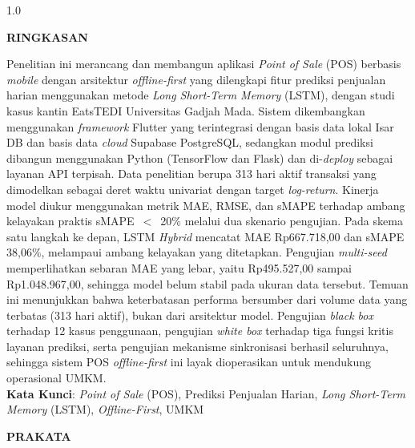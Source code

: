 \documentclass[12pt, a4paper, onecolumn, oneside]{report}
\begin{document}
\clearpage
{}
{}
\begin{spacing}{1.0}
\begin{center}
    \textbf{RINGKASAN}\\[0.5cm]
\end{center}

\noindent Penelitian ini merancang dan membangun aplikasi \textit{Point of Sale} (POS) berbasis \textit{mobile} dengan arsitektur \textit{offline-first} yang dilengkapi fitur prediksi penjualan harian menggunakan metode \textit{Long Short-Term Memory} (LSTM), dengan studi kasus kantin EatsTEDI Universitas Gadjah Mada. Sistem dikembangkan menggunakan \textit{framework} Flutter yang terintegrasi dengan basis data lokal Isar DB dan basis data \textit{cloud} Supabase PostgreSQL, sedangkan modul prediksi dibangun menggunakan Python (TensorFlow dan Flask) dan di-\textit{deploy} sebagai layanan API terpisah. Data penelitian berupa 313 hari aktif transaksi yang dimodelkan sebagai deret waktu univariat dengan target \textit{log-return}. Kinerja model diukur menggunakan metrik MAE, RMSE, dan sMAPE terhadap ambang kelayakan praktis sMAPE~$<$~20\% melalui dua skenario pengujian. Pada skema satu langkah ke depan, LSTM \textit{Hybrid} mencatat MAE Rp667.718,00 dan sMAPE 38,06\%, melampaui ambang kelayakan yang ditetapkan. Pengujian \textit{multi-seed} memperlihatkan sebaran MAE yang lebar, yaitu Rp495.527,00 sampai Rp1.048.967,00, sehingga model belum stabil pada ukuran data tersebut. Temuan ini menunjukkan bahwa keterbatasan performa bersumber dari volume data yang terbatas (313 hari aktif), bukan dari arsitektur model. Pengujian \textit{black box} terhadap 12 kasus penggunaan, pengujian \textit{white box} terhadap tiga fungsi kritis layanan prediksi, serta pengujian mekanisme sinkronisasi berhasil seluruhnya, sehingga sistem POS \textit{offline-first} ini layak dioperasikan untuk mendukung operasional UMKM.\\[0.6cm]

\noindent \textbf{Kata Kunci}: \textit{Point of Sale} (POS), Prediksi Penjualan Harian, \textit{Long Short-Term Memory} (LSTM), \textit{Offline-First}, UMKM
\end{spacing}

\newpage
{}
{}
\begin{center}
{\fontsize{14pt}{16pt}\selectfont\bfseries PRAKATA}
\end{center}
\vspace{0.5cm}
\end{document}
